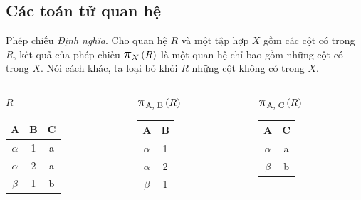 \documentclass[11pt]{beamer}
\newcommand{\mmm}[1]{\mathlarger{\mathlarger{\mathlarger#1}}}%
\newcommand{\ppi}[2]{\mmm{\pi}_{#1}\left(#2\right)}%
\begin{document}
  \subsection{Các toán tử quan hệ}
  \begin{frame}{Phép chiếu}
    \textit{Định nghĩa}. Cho quan hệ $R$ và một tập hợp $X$ gồm các cột có trong $R$, 
    kết quả của phép chiếu $\ppi{X}{R}$ là một quan hệ chỉ bao gồm những cột có trong $X$.
    Nói cách khác, ta loại bỏ khỏi $R$ những cột không có trong $X$. 
  \end{frame}
  \begin{frame}
    \begin{columns}[T]
      \begin{column}{0.4\textwidth}
        \centering $R$
        \bigskip \\
        \begin{tabular}{|c|c|c|}
          \hline
          \textbf{A} & \textbf{B} & \textbf{C}  \\[0.5ex] \hline\hline
          $\alpha$ & 1 & a\\ \hline
          $\alpha$ & 2 & a\\ \hline
          $\beta$ & 1 & b\\ \hline
        \end{tabular}
      \end{column}
      \begin{column}{0.25\textwidth}
        \centering $\ppi{\text{A, B}}{R}$
        \medskip \\
        \begin{tabular}{|c|c|}
          \hline
          \textbf{A} & \textbf{B} \\[0.5ex] \hline\hline
          $\alpha$ & 1\\ \hline
          $\alpha$ & 2\\ \hline
          $\beta$ & 1\\ \hline
        \end{tabular}
      \end{column}
      \begin{column}{0.25\textwidth}
        \centering $\ppi{\text{A, C}}{R}$
        \medskip \\
        \begin{tabular}{|c|c|}
          \hline
          \textbf{A} & \textbf{C} \\[0.5ex] \hline\hline
          $\alpha$ & a\\ \hline
          $\beta$ & b\\ \hline
        \end{tabular}
      \end{column}
    \end{columns}
  \end{frame}
\end{document}
